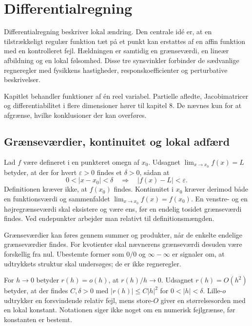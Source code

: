 \chapter{Differentialregning}
\label{ch:diff}
Differentialregning beskriver lokal ændring. Den centrale idé er, at en tilstrækkeligt regulær funktion tæt på et punkt kan erstattes af en affin funktion med en kontrolleret fejl. Hældningen er samtidig en grænseværdi, en lineær afbildning og en lokal følsomhed. Disse tre synsvinkler forbinder de sædvanlige regneregler med fysikkens hastigheder, responskoefficienter og perturbative beskrivelser.

Kapitlet behandler funktioner af én reel variabel. Partielle afledte, Jacobimatricer og differentiabilitet i flere dimensioner hører til kapitel 8. De nævnes kun for at afgrænse, hvilke konklusioner der kan overføres.

\section{Grænseværdier, kontinuitet og lokal adfærd}
\label{sec:graense}
Lad $f$ være defineret i en punkteret omegn af $x_0$. Udsagnet $\lim_{x\to x_0}f(x)=L$ betyder, at der for hvert $\varepsilon>0$ findes et $\delta>0$, sådan at
\[
0<|x-x_0|<\delta\quad\Longrightarrow\quad |f(x)-L|<\varepsilon.
\]
Definitionen kræver ikke, at $f(x_0)$ findes. Kontinuitet i $x_0$ kræver derimod både en funktionsværdi og sammenfaldet $\lim_{x\to x_0}f(x)=f(x_0)$. En venstre- og en højregrænseværdi skal eksistere og være ens, før en endelig tosidet grænseværdi findes. Ved endepunkter arbejder man relativt til definitionsmængden.

Grænseværdier kan føres gennem summer og produkter, når de enkelte endelige grænseværdier findes. For kvotienter skal nævnerens grænseværdi desuden være forskellig fra nul. Ubestemte former som $0/0$ og $\infty-\infty$ er signaler om, at udtrykkets struktur skal undersøges; de er ikke regneregler.

For $h\to0$ betyder $r(h)=o(h)$, at $r(h)/h\to0$. Udsagnet $r(h)=O(h^2)$ betyder, at der findes $C,\delta>0$ med $|r(h)|\le C|h|^2$ for $0<|h|<\delta$. Lille-$o$ udtrykker en forsvindende relativ fejl, mens store-$O$ giver en størrelsesorden med en lokal konstant. Notationen siger ikke noget om en numerisk fejlgrænse, før konstanten er bestemt.

